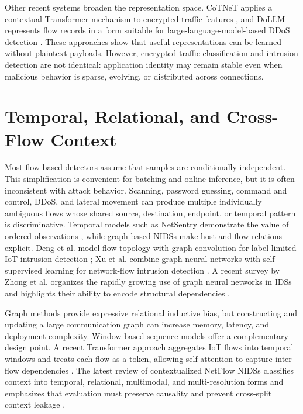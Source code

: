 \documentclass[11pt,fleqn]{report}
\begin{document}
Other recent systems broaden the representation space. CoTNeT applies a
contextual Transformer mechanism to encrypted-traffic features
\cite{Huang2024CoTNet}, and DoLLM represents flow records in a form suitable
for large-language-model-based DDoS detection \cite{Li2024DoLLM}. These
approaches show that useful representations can be learned without plaintext
payloads. However, encrypted-traffic classification and intrusion detection are
not identical: application identity may remain stable even when malicious
behavior is sparse, evolving, or distributed across connections.

\section{Temporal, Relational, and Cross-Flow Context}
\label{subsec:rw_cross_flow}

Most flow-based detectors assume that samples are conditionally independent. This simplification is convenient for batching and online inference, but it is often inconsistent with attack behavior. Scanning, password guessing, command and control, DDoS, and lateral movement can produce multiple individually ambiguous flows whose shared source, destination, endpoint, or temporal pattern is discriminative. Temporal models such as NetSentry demonstrate the value of ordered observations \cite{LiuPatras2022NetSentry}, while graph-based NIDSs make host and flow relations explicit. Deng et al. model flow topology with graph convolution for label-limited IoT intrusion detection \cite{Deng2023FlowTopology}; Xu et al. combine graph neural networks with self-supervised learning for network-flow intrusion detection \cite{Xu2024SSLGNN}. A recent survey by Zhong et al. organizes the rapidly growing use of graph neural networks in IDSs and highlights their ability to encode structural dependencies \cite{Zhong2024GNNSurvey}.

Graph methods provide expressive relational inductive bias, but constructing and updating a large communication graph can increase memory, latency, and deployment complexity. Window-based sequence models offer a complementary design point. A recent Transformer approach aggregates IoT flows into temporal windows and treats each flow as a token, allowing self-attention to capture inter-flow dependencies \cite{MartinReizabal2026FlowWindow}. The latest review of contextualized NetFlow NIDSs classifies context into temporal, relational, multimodal, and multi-resolution forms and emphasizes that evaluation must preserve causality and prevent cross-split context leakage \cite{ElMahdaouy2026ContextNetFlow}.
\end{document}
